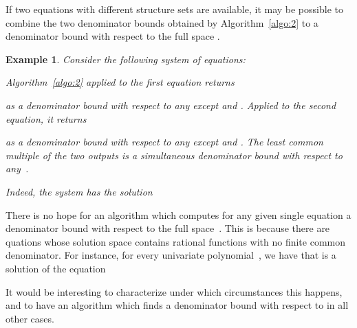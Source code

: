 \documentclass[a4paper]{sig-alternate}
\newtheorem{example}{Example}
\begin{document}
If two equations with different structure sets are available, it may be possible
to combine the two denominator bounds obtained by Algorithm~\ref{algo:2} to a
denominator bound with respect to the full space .

\begin{example}
  Consider the following system of equations:
  
  Algorithm~\ref{algo:2} applied to the first equation returns
  
  as a denominator bound with respect to any  except  and
  . Applied to the second equation, it returns
  
  as a denominator bound with respect to any  except  and
  . The least common multiple of the two outputs is a
  simultaneous denominator bound with respect to any~.

  Indeed, the system has the solution
  
\end{example}

There is no hope for an algorithm which computes for any given single equation a
denominator bound with respect to the full space~. This is because
there are quations whose solution space contains rational functions with no
finite common denominator. For instance, for every univariate polynomial~, we
have that  is a solution of the equation

It would be interesting to characterize under which circumstances this happens,
and to have an algorithm which finds a denominator bound with respect to 
in all other cases. 



\end{document}
